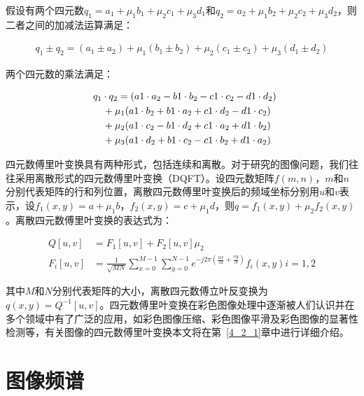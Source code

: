 假设有两个四元数$q_{1}=a_{1}+\mu_{1}b_{1}+\mu_{2}c_{1}+\mu_{3}d_{1}$和$q_{2}=a_{2}+\mu_{1}b_{2}+\mu_{2}c_{2}+\mu_{3}d_{2}$，则二者之间的加减法运算满足：
\begin{linenomath}
\begin{align}
q_{1}\pm q_{2}=(a_{1}\pm a_{2})+\mu_{1}(b_{1}\pm b_{2})+\mu_{2}(c_{1}\pm c_{2})+\mu_{3}(d_{1}\pm d_{2})
\label{式2_31}
\end{align}
\end{linenomath}
两个四元数的乘法满足：
\begin{linenomath}
\begin{align}
\lefteqn{ q_{1}\cdot q_{2}=(a{1}\cdot a_{2}-b{1}\cdot b_{2}-c{1}\cdot c_{2}-d{1}\cdot d_{2}) {}}\nonumber\\
&& {}+\mu_{1}(a{1}\cdot b_{2}+b{1}\cdot a_{2}+c{1}\cdot d_{2}-d{1}\cdot c_{2})\nonumber\\
&& {}+\mu_{2}(a{1}\cdot c_{2}-b{1}\cdot d_{2}+c{1}\cdot a_{2}+d{1}\cdot b_{2})\nonumber\\
&& {}+\mu_{3}(a{1}\cdot d_{2}+b{1}\cdot c_{2}-c{1}\cdot b_{2}+d{1}\cdot a_{2})
\label{式2_32}
\end{align}
\end{linenomath}

四元数傅里叶变换具有两种形式，包括连续和离散。对于研究的图像问题，我们往往采用离散形式的四元数傅里叶变换（DQFT）。设四元数矩阵$f(m,n)$，$m$和$n$分别代表矩阵的行和列位置，离散四元数傅里叶变换后的频域坐标分别用$u$和$v$表示，设$f_{1}(x,y)=a+\mu_{1} b$，$f_{2}(x,y)=c+\mu_{1} d$，则$q=f_{1}(x,y)+\mu_{2}f_{2}(x,y)$。离散四元数傅里叶变换的表达式为：
\begin{linenomath}
\begin{align}
Q[u,v] &= F_{1}[u,v]+F_{2}[u,v]\mu_{2}\label{式2_33}\\
F_{i}[u,v] &= \frac{1}{\sqrt{MN}}\sum_{x=0}^{M-1}\sum_{y=0}^{N-1}e^{-j2\pi (\frac{ux}{M}+\frac{vy}{N})}f_{i}(x,y)  i=1,2\label{式2_34}
\end{align}
\end{linenomath}
其中$M$和$N$分别代表矩阵的大小，离散四元数傅立叶反变换为$q(x,y)=Q^{-1}[u,v]$。四元数傅里叶变换在彩色图像处理中逐渐被人们认识并在多个领域中有了广泛的应用，如彩色图像压缩、彩色图像平滑及彩色图像的显著性检测等，有关图像的四元数傅里叶变换本文将在第~\ref{4_2_1}章中进行详细介绍。
\section{图像频谱}
\label{2_3}

